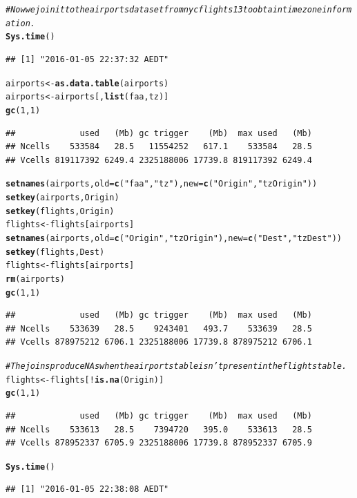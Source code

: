 \documentclass{scrreprt}\usepackage[]{graphicx}\usepackage[]{color}
\makeatletter
\newcommand{\hlnum}[1]{\textcolor[rgb]{0.686,0.059,0.569}{#1}}%
\newcommand{\hlstr}[1]{\textcolor[rgb]{0.192,0.494,0.8}{#1}}%
\newcommand{\hlcom}[1]{\textcolor[rgb]{0.678,0.584,0.686}{\textit{#1}}}%
\newcommand{\hlopt}[1]{\textcolor[rgb]{0,0,0}{#1}}%
\newcommand{\hlstd}[1]{\textcolor[rgb]{0.345,0.345,0.345}{#1}}%
\newcommand{\hlkwb}[1]{\textcolor[rgb]{0.69,0.353,0.396}{#1}}%
\newcommand{\hlkwc}[1]{\textcolor[rgb]{0.333,0.667,0.333}{#1}}%
\newcommand{\hlkwd}[1]{\textcolor[rgb]{0.737,0.353,0.396}{\textbf{#1}}}%
\newenvironment{kframe}{%
 \def\at@end@of@kframe{}%
 \ifinner\ifhmode%
  \def\at@end@of@kframe{\end{minipage}}%
  \begin{minipage}{\columnwidth}%
 \fi\fi%
 \def\FrameCommand##1{\hskip\@totalleftmargin \hskip-\fboxsep
 \colorbox{shadecolor}{##1}\hskip-\fboxsep
     \hskip-\linewidth \hskip-\@totalleftmargin \hskip\columnwidth}%
 \MakeFramed {\advance\hsize-\width
   \@totalleftmargin\z@ \linewidth\hsize
   \@setminipage}}%
 {\par\unskip\endMakeFramed%
 \at@end@of@kframe}
\newenvironment{knitrout}{}{} %
\makeatother
\begin{document}
\begin{knitrout}
\color{fgcolor}\begin{kframe}
\begin{alltt}
\hlcom{# Now we join it to the airports dataset from nycflights13 to obtain time zone information.}
\hlkwd{Sys.time}\hlstd{()}
\end{alltt}
\begin{verbatim}
## [1] "2016-01-05 22:37:32 AEDT"
\end{verbatim}
\begin{alltt}
\hlstd{airports} \hlkwb{<-} \hlkwd{as.data.table}\hlstd{(airports)}
\hlstd{airports} \hlkwb{<-} \hlstd{airports[,}\hlkwd{list}\hlstd{(faa, tz)]}
\hlkwd{gc}\hlstd{(}\hlnum{1}\hlstd{,}\hlnum{1}\hlstd{)}
\end{alltt}
\begin{verbatim}
##             used   (Mb) gc trigger    (Mb)  max used   (Mb)
## Ncells    533584   28.5   11554252   617.1    533584   28.5
## Vcells 819117392 6249.4 2325188006 17739.8 819117392 6249.4
\end{verbatim}
\begin{alltt}
\hlkwd{setnames}\hlstd{(airports,} \hlkwc{old} \hlstd{=} \hlkwd{c}\hlstd{(}\hlstr{"faa"}\hlstd{,} \hlstr{"tz"}\hlstd{),} \hlkwc{new} \hlstd{=} \hlkwd{c}\hlstd{(}\hlstr{"Origin"}\hlstd{,} \hlstr{"tzOrigin"}\hlstd{))}
\hlkwd{setkey}\hlstd{(airports, Origin)}
\hlkwd{setkey}\hlstd{(flights, Origin)}
\hlstd{flights} \hlkwb{<-} \hlstd{flights[airports]}
\hlkwd{setnames}\hlstd{(airports,} \hlkwc{old} \hlstd{=} \hlkwd{c}\hlstd{(}\hlstr{"Origin"}\hlstd{,} \hlstr{"tzOrigin"}\hlstd{),} \hlkwc{new} \hlstd{=} \hlkwd{c}\hlstd{(}\hlstr{"Dest"}\hlstd{,} \hlstr{"tzDest"}\hlstd{))}
\hlkwd{setkey}\hlstd{(flights, Dest)}
\hlstd{flights} \hlkwb{<-} \hlstd{flights[airports]}
\hlkwd{rm}\hlstd{(airports)}
\hlkwd{gc}\hlstd{(}\hlnum{1}\hlstd{,}\hlnum{1}\hlstd{)}
\end{alltt}
\begin{verbatim}
##             used   (Mb) gc trigger    (Mb)  max used   (Mb)
## Ncells    533639   28.5    9243401   493.7    533639   28.5
## Vcells 878975212 6706.1 2325188006 17739.8 878975212 6706.1
\end{verbatim}
\begin{alltt}
\hlcom{# The joins produce NAs when the airports table isn't present in the flights table.}
\hlstd{flights} \hlkwb{<-} \hlstd{flights[}\hlopt{!}\hlkwd{is.na}\hlstd{(Origin)]}
\hlkwd{gc}\hlstd{(}\hlnum{1}\hlstd{,}\hlnum{1}\hlstd{)}
\end{alltt}
\begin{verbatim}
##             used   (Mb) gc trigger    (Mb)  max used   (Mb)
## Ncells    533613   28.5    7394720   395.0    533613   28.5
## Vcells 878952337 6705.9 2325188006 17739.8 878952337 6705.9
\end{verbatim}
\begin{alltt}
\hlkwd{Sys.time}\hlstd{()}
\end{alltt}
\begin{verbatim}
## [1] "2016-01-05 22:38:08 AEDT"
\end{verbatim}
\end{kframe}
\end{knitrout}
\end{document}
